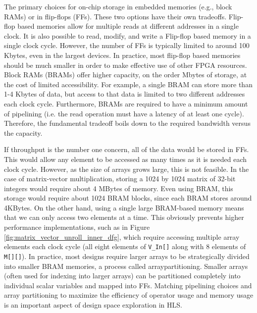 The primary choices for on-chip storage in embedded memories (e.g., block RAMs) or in flip-flops (FFs). These two options have their own tradeoffs. Flip-flop based memories allow for multiple reads at different addresses in a single clock.  It is also possible to read, modify, and write a Flip-flop based memory in a single clock cycle.  However, the number of FFs is typically limited to around 100 Kbytes, even in the largest devices. In practice, most flip-flop based memories should be much smaller in order to make effective use of other FPGA resources.  Block RAMs (BRAMs) offer higher capacity, on the order Mbytes of storage, at the cost of limited accessibility. For example, a single BRAM can store more than 1-4 Kbytes of data, but access to that data is limited to two different addresses each clock cycle. Furthermore, BRAMs are required to have a minimum amount of pipelining (i.e. the read operation must have a latency of at least one cycle).  Therefore, the fundamental tradeoff boils down to the required bandwidth versus the capacity. 

If throughput is the number one concern, all of the data would be stored in FFs. This would allow any element to be accessed as many times as it is needed each clock cycle. However, as the size of arrays grows large, this is not feasible.  In the case of matrix-vector multiplication, storing a 1024 by 1024 matrix of 32-bit integers would require about 4 MBytes of memory.   Even using BRAM, this storage would require about 1024 BRAM blocks, since each BRAM stores around 4KBytes.  On the other hand, using a single large BRAM-based memory means that we can only access two elements at a time.  This obviously prevents higher performance implementations, such as in Figure \ref{fig:matrix_vector_unroll_inner_dfg}, which require accessing multiple array elements each clock cycle (all eight elements of \lstinline|V_In[]| along with 8 elements of \lstinline|M[][]|).  In practice, most designs require larger arrays to be strategically divided into smaller BRAM memories, a process called \gls{arraypartitioning}.  Smaller arrays (often used for indexing into larger arrays) can be partitioned completely into individual scalar variables and mapped into FFs.  Matching pipelining choices and array partitioning to maximize the efficiency of operator usage and memory usage is an important aspect of design space exploration in HLS.

